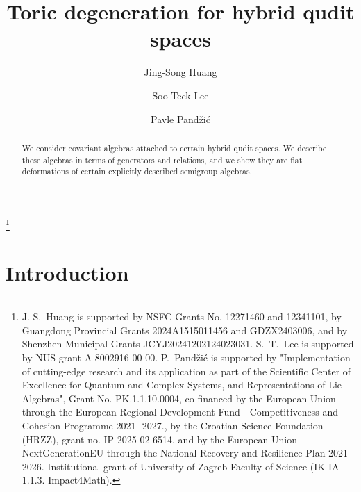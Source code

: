 \documentclass[reqno,11pt]{amsart}
\theoremstyle{remark}
\theoremstyle{definition}
\numberwithin{equation}{section}
\begin{document}
\title{Toric degeneration for hybrid qudit spaces}
\author{Jing-Song Huang}
\address[Huang]{School of Science and Engineering, The Chinese Universit of Hong Kong, Shenzhen, 2001 Long Xiang Road, Long Gang District, Shenzhen, Guangdong, China.}
\author{Soo Teck Lee}
\address[Lee]{Department of Mathematics\\
National University of Singapore\\
2 Science Drive 2\\
Singapore 117543, Singapore.} 

\author{Pavle Pand\v zi\'c}
\address[Pand\v zi\'c]{Department of Mathematics, Faculty of Science, University of Zagreb, Bijeni\v cka 30, 10000 Zagreb, Croatia.}
\thanks{J.-S.~Huang is supported by NSFC Grants No. 12271460 and 12341101, by Guangdong Provincial Grants 2024A1515011456 and GDZX2403006, and by 	
	Shenzhen Municipal Grants JCYJ20241202124023031.  S.~T.~Lee is supported by NUS grant A-8002916-00-00. 
	P.~Pand\v zi\'c is supported by "Implementation of cutting-edge research and its application as part of the Scientific Center of Excellence for Quantum and Complex Systems, and Representations of Lie Algebras", Grant No. PK.1.1.10.0004, co-financed by the European Union through the European Regional Development Fund - Competitiveness and Cohesion Programme 2021- 2027., by the Croatian Science Foundation (HRZZ), grant no. IP-2025-02-6514, and
	by the European Union - NextGenerationEU through the National Recovery and Resilience Plan 2021-2026. Institutional grant of University of Zagreb Faculty of Science (IK IA 1.1.3. Impact4Math).}
\begin{abstract} We consider covariant algebras attached to certain hybrid qudit spaces. We describe these algebras in terms of generators and relations, and we show they are flat deformations of certain explicitly described semigroup algebras.
\end{abstract}

\maketitle

\section{Introduction}
\end{document}
